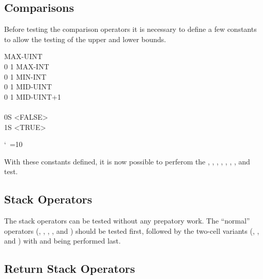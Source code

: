 \subsection{Comparisons}

Before testing the comparison operators it is necessary to define
a few constants to allow the testing of the upper and lower bounds.

\begin{tt}\frenchspacing{}                 					 MAX-UINT \\
0  1        			 MAX-INT \\
0  1  	 MIN-INT \\
0  1        			 MID-UINT \\
0  1  	 MID-UINT+1 \\
\\
0S  <FALSE> \\
1S  <TRUE>
\end{tt}
\nonfrenchspacing\catcode`\ =10

With these constants defined, it is now possible to perferom the
	,
	,
	,
	,
	,
	,
	, and
	 test.

\subsection{Stack Operators}

The stack operators can be tested without any prepatory work.  The
``normal'' operators
	(,
	 ,
	 ,
	 , and
	 )
should be tested first, followed by the two-cell variants
	(,
	 ,
	  and \linebreak
	 )
with  and  being
performed last.

\subsection{Return Stack Operators}

